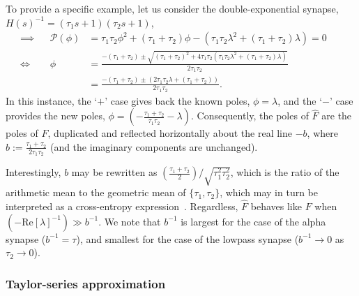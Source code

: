 To provide a specific example, let us consider the double-exponential synapse, $H(s)^{-1} = (\tau_1 s + 1)(\tau_2 s + 1)$,
\begin{align*}
\implies && \mathcal{P}(\phi) &= \tau_1 \tau_2 \phi^2 + (\tau_1 + \tau_2) \phi - (\tau_1 \tau_2 \lambda^2 + (\tau_1 + \tau_2) \lambda) = 0 && \\
\iff && \phi &= \frac{-(\tau_1 + \tau_2) \pm \sqrt{(\tau_1 + \tau_2)^2 + 4\tau_1 \tau_2 \left(\tau_1 \tau_2 \lambda^2 + (\tau_1 + \tau_2) \lambda \right)}}{2 \tau_1 \tau_2} && \\
&& &= \frac{-(\tau_1 + \tau_2) \pm \left(2 \tau_1 \tau_2 \lambda + (\tau_1 + \tau_2) \right)}{2 \tau_1 \tau_2} \text{.} &&
\end{align*}
In this instance, the `$+$' case gives back the known poles, $\phi = \lambda$, and the `$-$' case provides the new poles, $\phi = \left(- \frac{\tau_1 + \tau_2}{\tau_1 \tau_2} - \lambda \right)$.
Consequently, the poles of $\hat{F}$ are the poles of $F$, duplicated and reflected horizontally about the real line $- b$, where $b := \frac{\tau_1 + \tau_2}{2 \tau_1 \tau_2}$ (and the imaginary components are unchanged).

Interestingly, $b$ may be rewritten as $\left( \frac{ \tau_1 + \tau_2}{2} \right) / \sqrt{\tau_1^2 \tau_2^2}$, which is the ratio of the arithmetic mean to the geometric mean of $\{\tau_1, \tau_2\}$, which may in turn be interpreted as a cross-entropy expression~\citep{woodhouse2001ratio}.
Regardless, $\hat{F}$ behaves like $F$ when $\left(-\text{Re}\left[ \lambda \right]^{-1} \right) \gg b^{-1}$.
We note that $b^{-1}$ is largest for the case of the alpha synapse ($b^{-1} = \tau$), and smallest for the case of the lowpass synapse ($b^{-1} \rightarrow 0$ as $\tau_2 \rightarrow 0$).

\subsubsection{Taylor-series approximation}


